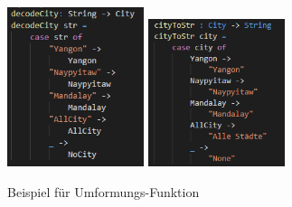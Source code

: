 \documentclass[usegeometry=true]{scrartcl}
\begin{document}
\begin{figure} [H]
	\begin{center}
		\includegraphics[width=4cm]{IMG/StrToCity}
		\includegraphics[width=4cm]{IMG/cityToStr}
		\caption{Beispiel für Umformungs-Funktion}
		\label{fig:Umformung}
	\end{center}
\end{figure}


\printbibliography
\end{document}
